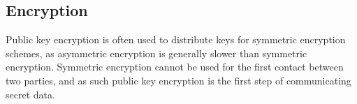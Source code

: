 \subsection{Encryption}
\label{sec:math_encryption}

Public key encryption is often used to distribute keys for symmetric encryption schemes, as asymmetric encryption
is generally slower than symmetric encryption. Symmetric encryption cannot be used for the first contact between
two parties, and as such public key encryption is the first step of communicating secret data.

